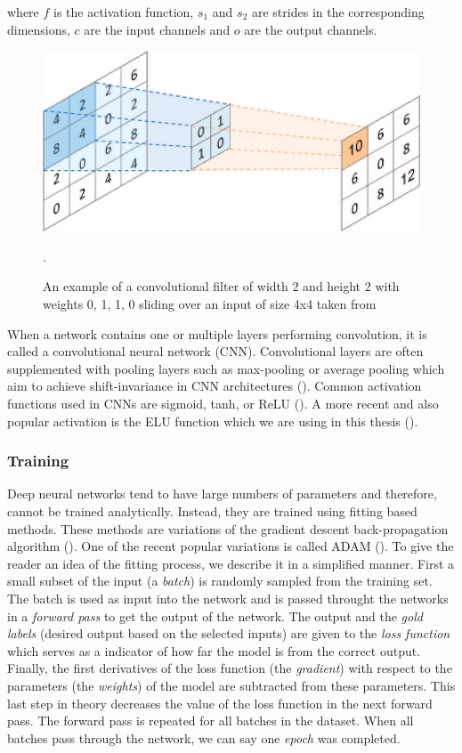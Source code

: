 where $f$ is the activation function, $s_1$ and $s_2$ are strides in the corresponding dimensions, $c$ are the input channels and $o$ are the output channels.

\begin{figure}[!htpb]
\centering
   \includegraphics[width=0.8\linewidth]{img/ch2/convolution.jpg}
   \caption[Convolutional filter]{An example of a convolutional filter of width 2 and height 2 with weights 0, 1, 1, 0 sliding over an input of size 4x4 taken from \cite{conv-diagram}}.
\end{figure}\label{fig:convolution}

When a network contains one or multiple layers performing convolution, it is called a convolutional neural network (CNN).
Convolutional layers are often supplemented with pooling layers such as max-pooling or average pooling which aim to achieve shift-invariance in CNN architectures (\cite{cnn-description}). 
Common activation functions used in CNNs are sigmoid, tanh, or ReLU (\cite{relu-paper}).
A more recent and also popular activation is the ELU function which we are using in this thesis (\cite{clevert-elu-2016}). 

\subsubsection{Training}
Deep neural networks tend to have large numbers of parameters and therefore, cannot be trained analytically.
Instead, they are trained using fitting based methods. These methods are variations of the gradient descent back-propagation algorithm (\cite{back-prop}). One of the recent popular variations is called ADAM (\cite{kingma-adam-2017}). 
To give the reader an idea of the fitting process, we describe it in a simplified manner. 
First a small subset of the input (a \textit{batch}) is randomly sampled from the training set. 
The batch is used as input into the network and is passed throught the networks in a \textit{forward pass} to get the output of the network. 
The output and the \textit{gold labels} (desired output based on the selected inputs) are given to the \textit{loss function} which serves as a indicator of how far the model is from the correct output. 
Finally, the first derivatives of the loss function (the \textit{gradient}) with respect to the parameters (the \textit{weights}) of the model are subtracted from these parameters.
This last step in theory decreases the value of the loss function in the next forward pass.
The forward pass is repeated for all batches in the dataset. When all batches pass through the network, we can say one \textit{epoch} was completed. 

